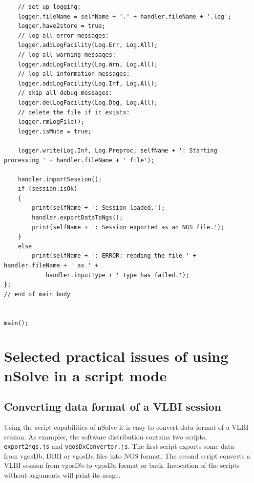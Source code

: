 \documentclass [10pt,letterpaper]{report}
\newcommand{\nuSolve}{\greektext n\latintext Solve}
\begin{document}
{{{\begin{verbatim}
    // set up logging:
    logger.fileName = selfName + '.' + handler.fileName + '.log';
    logger.have2store = true;
    // log all error messages:
    logger.addLogFacility(Log.Err, Log.All);
    // log all warning messages:
    logger.addLogFacility(Log.Wrn, Log.All);
    // log all information messages:
    logger.addLogFacility(Log.Inf, Log.All);
    // skip all debug messages:
    logger.delLogFacility(Log.Dbg, Log.All);
    // delete the file if it exists:
    logger.rmLogFile();
    logger.isMute = true;

    logger.write(Log.Inf, Log.Preproc, selfName + ': Starting processing ' + handler.fileName + ' file');

    handler.importSession();
    if (session.isOk)
    {
        print(selfName + ': Session loaded.');
        handler.exportDataToNgs();
        print(selfName + ': Session exported as an NGS file.');
    }
    else
        print(selfName + ': ERROR: reading the file ' + handler.fileName + ' as ' +
            handler.inputType + ' type has failed.');
};
// end of main body


main();
\end{verbatim}}
\noindent






%
%
%
%
\chapter{Selected practical issues of using \nuSolve{} in a script mode}
\label{chapter-using-sript-mode}


\section{Converting data format of a VLBI session}
\label{section-using-script-converts}

Using the script capabilities of \nuSolve{} it is easy to convert data format
of a VLBI session. As examples, the software distribution contains two scripts,
{\tt export2ngs.js} and {\tt vgosDxConvertor.js}. The first script exports
some data from vgosDb, DBH or vgosDa files into NGS format. The second script
converts a VLBI session from vgosDb to vgosDa format or back. Invocation of the
scripts without arguments will print its usage.

}}
\end{document}
